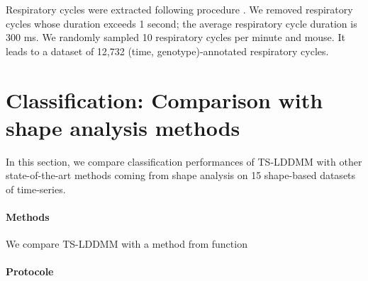 Respiratory cycles were extracted following procedure \cite{germain2023unsupervised}. We removed 
respiratory cycles whose duration exceeds 1 second; the average respiratory cycle duration is 
300 ms. We randomly sampled 10 respiratory cycles per minute and mouse. It leads to a dataset of 
12,732 (time, genotype)-annotated respiratory cycles. 

\section{Classification: Comparison with shape analysis methods}

In this section, we compare classification performances of TS-LDDMM with other state-of-the-art methods coming from shape analysis on 15 shape-based datasets of time-series.

\paragraph{Methods} We compare TS-LDDMM with a method from function~\cite{wu2024shape}

\paragraph{Protocole}

